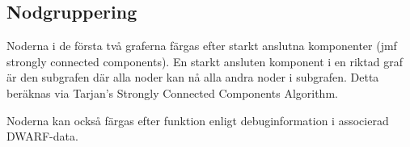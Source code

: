 \subsection{Nodgruppering}
Noderna i de första två graferna färgas efter starkt anslutna
komponenter (jmf strongly connected components). En starkt ansluten
komponent i en riktad graf är den subgrafen där alla noder kan nå alla
andra noder i subgrafen. Detta beräknas via Tarjan's
Strongly Connected Components Algorithm.~\cite{tarjan}

Noderna kan också färgas efter funktion enligt debuginformation i
associerad DWARF-data.

